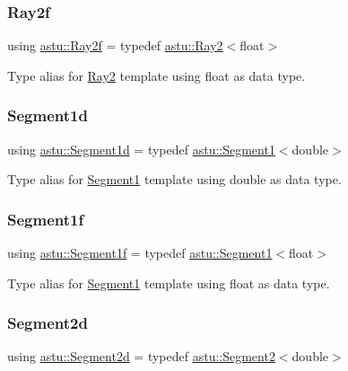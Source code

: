 \subsubsection{\texorpdfstring{Ray2f}{Ray2f}}
{\footnotesize\ttfamily using \hyperlink{group__math__group_gaa8986be7101408a7fbfdd07c73ecf8cb}{astu\+::\+Ray2f} = typedef \hyperlink{classastu_1_1Ray2}{astu\+::\+Ray2}$<$float$>$}

Type alias for \hyperlink{classastu_1_1Ray2}{Ray2} template using float as data type. \mbox{\label{group__math__group_ga3ed894c1b9f965fa9905c6f5a71ab5d4}} 
\subsubsection{\texorpdfstring{Segment1d}{Segment1d}}
{\footnotesize\ttfamily using \hyperlink{group__math__group_ga3ed894c1b9f965fa9905c6f5a71ab5d4}{astu\+::\+Segment1d} = typedef \hyperlink{classastu_1_1Segment1}{astu\+::\+Segment1}$<$double$>$}

Type alias for \hyperlink{classastu_1_1Segment1}{Segment1} template using double as data type. \mbox{\label{group__math__group_gadaf20507cd638f02e10a5437a9810623}} 
\subsubsection{\texorpdfstring{Segment1f}{Segment1f}}
{\footnotesize\ttfamily using \hyperlink{group__math__group_gadaf20507cd638f02e10a5437a9810623}{astu\+::\+Segment1f} = typedef \hyperlink{classastu_1_1Segment1}{astu\+::\+Segment1}$<$float$>$}

Type alias for \hyperlink{classastu_1_1Segment1}{Segment1} template using float as data type. \mbox{\label{group__math__group_ga4a6a4a3ba71e40694ac08f39fa00a3bc}} 
\subsubsection{\texorpdfstring{Segment2d}{Segment2d}}
{\footnotesize\ttfamily using \hyperlink{group__math__group_ga4a6a4a3ba71e40694ac08f39fa00a3bc}{astu\+::\+Segment2d} = typedef \hyperlink{classastu_1_1Segment2}{astu\+::\+Segment2}$<$double$>$}


